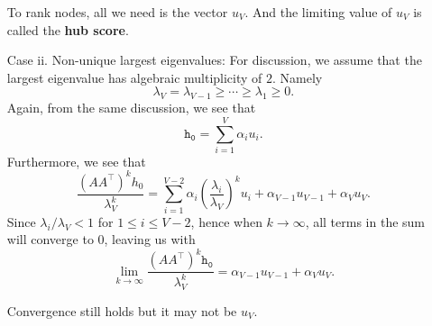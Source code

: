 \begin{enumerate}
		\begin{remark}
			To rank nodes, all we need is the vector \(u_{V}\). And the limiting value of \(u_{V}\) is called the \textbf{hub score}.
		\end{remark}
	\item[Case ii.] Non-unique largest eigenvalues: For discussion, we assume that the largest eigenvalue has algebraic multiplicity of \(2\). Namely
		\[
			\lambda_V = \lambda_{V-1} \geq \cdots \geq \lambda_{1}\geq 0.
		\]
		Again, from the same discussion, we see that
		\[
			\mathtt{h_{0}} = \sum\limits_{i=1}^{V} \alpha_{i}u_{i}.
		\]
		Furthermore, we see that
		\[
			\frac{\left(A A^{\top}\right)^k h_0}{\lambda_{V}^k} = \sum\limits_{i=1}^{V - 2} \alpha_{i}\left(\frac{\lambda_{i}}{\lambda_{V}}\right)^k u_{i} + \alpha_{V-1}u_{V-1}+\alpha_{V} u_{V}.
		\]
		Since \(\lambda_{i}/\lambda_{V}< 1\) for \(1\leq i\leq V-2\), hence when \(k\to \infty \), all terms in the sum will converge to \(0\), leaving us with
		\[
			\lim_{k \to \infty} \frac{(A A^{\top})^{k}\mathtt{h_0}}{\lambda_V^k} = \alpha_{V-1}u_{V-1} + \alpha_V u_V.
		\]
		\begin{remark}
			Convergence still holds but it may not be \(u_{V}\).
		\end{remark}
\end{enumerate}



